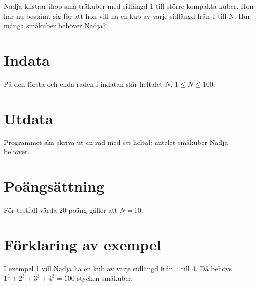 %
Nadja klistrar ihop små träkuber med sidlängd 1 till större kompakta kuber. Hon har nu bestämt sig för att hon vill ha en kub av varje sidlängd från 1 till N. Hur många småkuber behöver Nadja?

\section*{Indata}
På den första och enda raden i indatan står heltalet $N$, $1 \leq N \leq 100$.

\section*{Utdata}
Programmet ska skriva ut en rad med ett heltal: antelet småkuber Nadja behöver.

\section*{Poängsättning}
För testfall värda $20$ poäng gäller att $N=10$.

\section*{Förklaring av exempel}
I exempel 1 vill Nadja ha en kub av varje sidlängd från $1$ till $4$.
Då behövs $1^3 + 2^3 + 3^3 + 4^3 = 100$ stycken småkuber.
